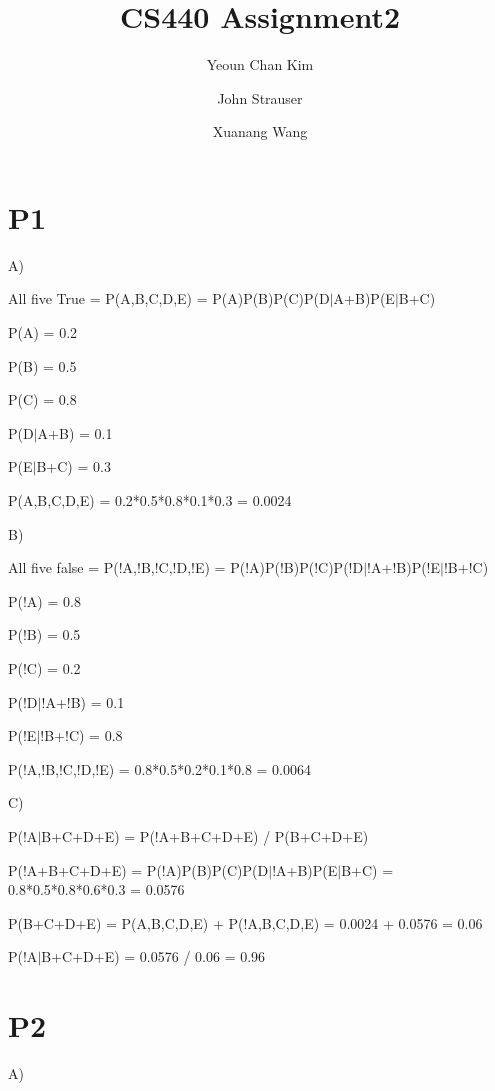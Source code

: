 \documentclass{article}
\author{Yeoun Chan Kim \and John Strauser \and Xuanang Wang}
\title{CS440 Assignment2}
\begin{document}
\maketitle

\section*{P1}

\hspace{5mm}


A) 	

        All five True = P(A,B,C,D,E) = P(A)P(B)P(C)P(D$|$A+B)P(E$|$B+C)

	P(A) = 0.2
	
	P(B) = 0.5
	
	P(C) = 0.8
	
	P(D$|$A+B) = 0.1
	
	P(E$|$B+C) = 0.3
	
	P(A,B,C,D,E) = 0.2*0.5*0.8*0.1*0.3 = 0.0024

\hspace{5mm}

B)	

        All five false = P(!A,!B,!C,!D,!E) = P(!A)P(!B)P(!C)P(!D$|$!A+!B)P(!E$|$!B+!C)
        
	P(!A) = 0.8
	
	P(!B) = 0.5
	
	P(!C) = 0.2
	
	P(!D$|$!A+!B) = 0.1
	
	P(!E$|$!B+!C) = 0.8
	
	P(!A,!B,!C,!D,!E) = 0.8*0.5*0.2*0.1*0.8 = 0.0064

\hspace{5mm}

C)	

        P(!A$|$B+C+D+E) = P(!A+B+C+D+E) / P(B+C+D+E)

	P(!A+B+C+D+E) = P(!A)P(B)P(C)P(D$|$!A+B)P(E$|$B+C) = 0.8*0.5*0.8*0.6*0.3 = 0.0576
	
	P(B+C+D+E) =  P(A,B,C,D,E) + P(!A,B,C,D,E) = 0.0024 + 0.0576 = 0.06
	
	P(!A$|$B+C+D+E) = 0.0576 / 0.06 = 0.96
	
	
\section*{P2}

\hspace{5mm}

A) 	
\end{document}
